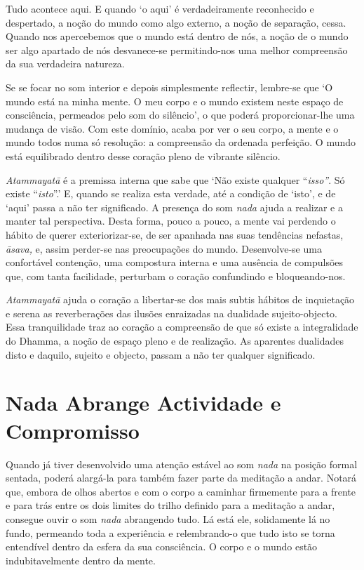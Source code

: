Tudo acontece aqui. E quando `o aqui' é verdadeiramente reconhecido e
despertado, a noção do mundo como algo externo, a noção de separação,
cessa. Quando nos apercebemos que o mundo está dentro de nós, a noção de
o mundo ser algo apartado de nós desvanece-se permitindo-nos uma melhor
compreensão da sua verdadeira natureza.

Se se focar no som interior e depois simplesmente reflectir, lembre-se
que `O mundo está na minha mente. O meu corpo e o mundo existem neste
espaço de consciência, permeados pelo som do silêncio', o que poderá
proporcionar-lhe uma mudança de visão. Com este domínio, acaba por ver o
seu corpo, a mente e o mundo todos numa só resolução: a compreensão da
ordenada perfeição. O mundo está equilibrado dentro desse coração pleno
de vibrante silêncio.

\emph{Atammayatā} é a premissa interna que sabe que `Não existe qualquer
``\emph{isso''}. Só existe ``\emph{isto}''.' E, quando se realiza esta
verdade, até a condição de `isto', e de `aqui' passa a não ter
significado. A presença do som \emph{nada} ajuda a realizar e a manter
tal perspectiva. Desta forma, pouco a pouco, a mente vai perdendo o
hábito de querer exteriorizar-se, de ser apanhada nas suas tendências
nefastas, \emph{āsava,} e, assim perder-se nas preocupações do mundo.
Desenvolve-se uma confortável contenção, uma compostura interna e uma
ausência de compulsões que, com tanta facilidade, perturbam o coração
confundindo e bloqueando-nos.

\emph{Atammayatā} ajuda o coração a libertar-se dos mais subtis hábitos
de inquietação e serena as reverberações das ilusões enraizadas na
dualidade sujeito-objecto. Essa tranquilidade traz ao coração a
compreensão de que só existe a integralidade do Dhamma, a noção de
espaço pleno e de realização. As aparentes dualidades disto e daquilo,
sujeito e objecto, passam a não ter qualquer significado.

\section{Nada Abrange Actividade e Compromisso}

Quando já tiver desenvolvido uma atenção estável ao som \emph{nada} na
posição formal sentada, poderá alargá-la para também fazer parte da
meditação a andar. Notará que, embora de olhos abertos e com o corpo a
caminhar firmemente para a frente e para trás entre os dois limites do
trilho definido para a meditação a andar, consegue ouvir o som
\emph{nada} abrangendo tudo. Lá está ele, solidamente lá no fundo,
permeando toda a experiência e relembrando-o que tudo isto se torna
entendível dentro da esfera da sua consciência. O corpo e o mundo estão
indubitavelmente dentro da mente.

